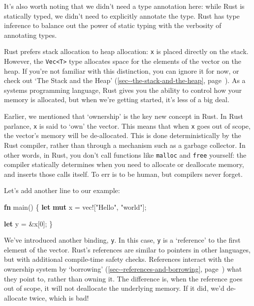 \documentclass[a4paper,]{book}
\renewcommand*{\hyperref}[2][\ar]{%
  \def\ar{#2}%
  #2 (\autoref{#1}, page~\pageref{#1})}
\newenvironment{Shaded}{\begin{snugshade}}{\end{snugshade}}
\newcommand{\KeywordTok}[1]{\textcolor[rgb]{0.13,0.29,0.53}{\textbf{{#1}}}}
\newcommand{\DecValTok}[1]{\textcolor[rgb]{0.00,0.00,0.81}{{#1}}}
\newcommand{\StringTok}[1]{\textcolor[rgb]{0.31,0.60,0.02}{{#1}}}
\newcommand{\OtherTok}[1]{\textcolor[rgb]{0.56,0.35,0.01}{{#1}}}
\newcommand{\NormalTok}[1]{{#1}}
\begin{document}
It's also worth noting that we didn't need a type annotation here: while
Rust is statically typed, we didn't need to explicitly annotate the
type. Rust has type inference to balance out the power of static typing
with the verbosity of annotating types.

Rust prefers stack allocation to heap allocation: \texttt{x} is placed
directly on the stack. However, the
\texttt{Vec\textless{}T\textgreater{}} type allocates space for the
elements of the vector on the heap. If you're not familiar with this
distinction, you can ignore it for now, or check out
\hyperref[sec--the-stack-and-the-heap]{`The Stack and the Heap'}. As a
systems programming language, Rust gives you the ability to control how
your memory is allocated, but when we're getting started, it's less of a
big deal.

Earlier, we mentioned that `ownership' is the key new concept in Rust.
In Rust parlance, \texttt{x} is said to `own' the vector. This means
that when \texttt{x} goes out of scope, the vector's memory will be
de-allocated. This is done deterministically by the Rust compiler,
rather than through a mechanism such as a garbage collector. In other
words, in Rust, you don't call functions like \texttt{malloc} and
\texttt{free} yourself: the compiler statically determines when you need
to allocate or deallocate memory, and inserts those calls itself. To err
is to be human, but compilers never forget.

Let's add another line to our example:

\begin{Shaded}
\begin{Highlighting}[]
\KeywordTok{fn} \NormalTok{main() \{}
    \KeywordTok{let} \KeywordTok{mut} \NormalTok{x = }\OtherTok{vec!}\NormalTok{[}\StringTok{"Hello"}\NormalTok{, }\StringTok{"world"}\NormalTok{];}

    \KeywordTok{let} \NormalTok{y = &x[}\DecValTok{0}\NormalTok{];}
\NormalTok{\}}
\end{Highlighting}
\end{Shaded}

We've introduced another binding, \texttt{y}. In this case, \texttt{y}
is a `reference' to the first element of the vector. Rust's references
are similar to pointers in other languages, but with additional
compile-time safety checks. References interact with the ownership
system by \hyperref[sec--references-and-borrowing]{`borrowing'} what
they point to, rather than owning it. The difference is, when the
reference goes out of scope, it will not deallocate the underlying
memory. If it did, we'd de-allocate twice, which is bad!
\end{document}

